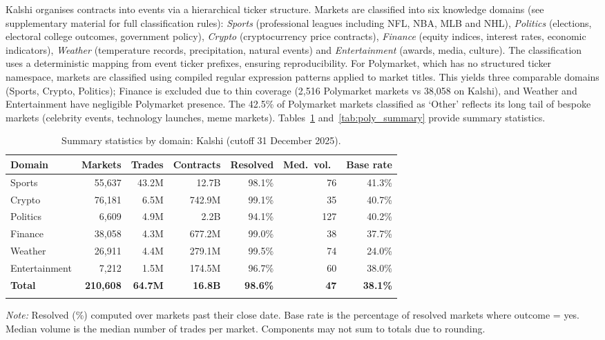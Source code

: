 \documentclass[numsec,webpdf,modern,medium]{oup-authoring-template}
\theoremstyle{thmstyleone}%
\theoremstyle{thmstyletwo}%
\theoremstyle{thmstylethree}%
\begin{document}
Kalshi organises contracts into events via a hierarchical ticker structure. Markets are classified into six knowledge domains (see supplementary material for full classification rules): \emph{Sports} (professional leagues including NFL, NBA, MLB and NHL), \emph{Politics} (elections, electoral college outcomes, government policy), \emph{Crypto} (cryptocurrency price contracts), \emph{Finance} (equity indices, interest rates, economic indicators), \emph{Weather} (temperature records, precipitation, natural events) and \emph{Entertainment} (awards, media, culture). The classification uses a deterministic mapping from event ticker prefixes, ensuring reproducibility. For Polymarket, which has no structured ticker namespace, markets are classified using compiled regular expression patterns applied to market titles. This yields three comparable domains (Sports, Crypto, Politics); Finance is excluded due to thin coverage (2,516 Polymarket markets vs 38,058 on Kalshi), and Weather and Entertainment have negligible Polymarket presence. The 42.5\% of Polymarket markets classified as `Other' reflects its long tail of bespoke markets (celebrity events, technology launches, meme markets). Tables~\ref{tab:kalshi_summary} and~\ref{tab:poly_summary} provide summary statistics.

\begin{table}[!t]
\caption{Summary statistics by domain: Kalshi (cutoff 31 December 2025).\label{tab:kalshi_summary}}%
\begin{tabular*}{\columnwidth}{@{\extracolsep\fill}lrrrrrr@{\extracolsep\fill}}
\toprule
Domain & Markets & Trades & Contracts & Resolved & Med.\ vol.\ & Base rate \\
\midrule
Sports        & 55,637   & 43.2M  & 12.7B  & 98.1\% & 76  & 41.3\% \\
Crypto        & 76,181   & 6.5M   & 742.9M & 99.1\% & 35  & 40.7\% \\
Politics      & 6,609    & 4.9M   & 2.2B   & 94.1\% & 127 & 40.2\% \\
Finance       & 38,058   & 4.3M   & 677.2M & 99.0\% & 38  & 37.7\% \\
Weather       & 26,911   & 4.4M   & 279.1M & 99.5\% & 74  & 24.0\% \\
Entertainment & 7,212    & 1.5M   & 174.5M & 96.7\% & 60  & 38.0\% \\
\midrule
\textbf{Total}& \textbf{210,608} & \textbf{64.7M} & \textbf{16.8B} & \textbf{98.6\%} & \textbf{47} & \textbf{38.1\%} \\
\botrule
\end{tabular*}
\begin{tablenotes}%
\item \emph{Note:} Resolved (\%) computed over markets past their close date. Base rate is the percentage of resolved markets where outcome = yes. Median volume is the median number of trades per market. Components may not sum to totals due to rounding.
\end{tablenotes}
\end{table}
\end{document}
